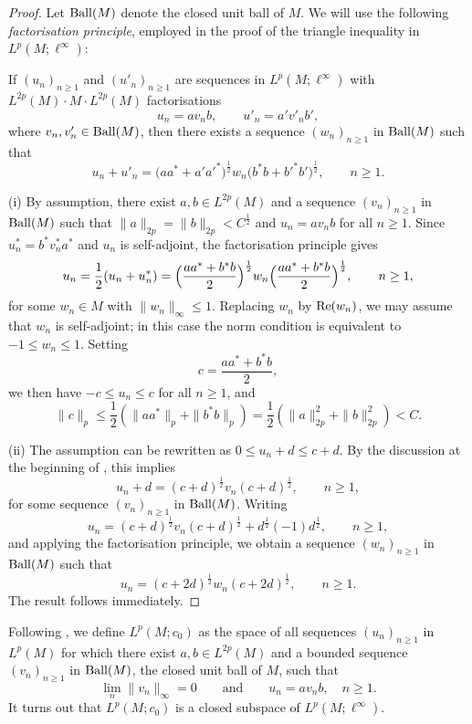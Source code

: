 \documentclass[12pt]{amsart}
\theoremstyle{remark}
\theoremstyle{definition}
\numberwithin{equation}{section}
\begin{document}
\begin{proof}
Let ${\rm Ball}(M)$ denote the closed unit ball of $M$. 
We will use the following {\it factorisation principle}, employed in the proof of the triangle inequality in $L^p(M;\ell^\infty)$: 

If $(u_n)_{n\ge 1}$ and $(u'_n)_{n\ge 1}$ are sequences in $L^p(M;\ell^\infty)$ with $L^{2p}(M) \cdotp M \cdotp L^{2p}(M)$ factorisations
$$
u_n = a v_n b, \qquad u'_n = a' v'_n b',
$$
where $v_n, v'_n \in {\rm Ball}(M)$, then there exists a sequence $(w_n)_{n\ge 1}$ in ${\rm Ball}(M)$ such that
$$
u_n + u'_n = \bigl(aa^* + a'a'^*\bigr)^{\frac12} w_n \bigl(b^*b + b'^*b'\bigr)^{\frac12}, \qquad n \ge 1.
$$

\smallskip
(i) By assumption, there exist $a, b \in L^{2p}(M)$ and a sequence $(v_n)_{n\ge 1}$ in ${\rm Ball}(M)$ such that 
$\|a\|_{2p} = \|b\|_{2p} < C^{\frac12}$ and $u_n = a v_n b$ for all $n \ge 1$.  
Since $u_n^* = b^* v_n^* a^*$ and $u_n$ is self-adjoint, the factorisation principle gives
$$
u_n = \frac12(u_n + u_n^*) = \Bigl(\frac{aa^* + b^*b}{2}\Bigr)^{\frac12} w_n \Bigl(\frac{aa^* + b^*b}{2}\Bigr)^{\frac12}, \qquad n \ge 1,
$$
for some $w_n \in M$ with $\|w_n\|_\infty \le 1$.  
Replacing $w_n$ by ${\rm Re}(w_n)$, we may assume that $w_n$ is self-adjoint; 
in this case the norm condition is equivalent to $-1 \le w_n \le 1$.  
Setting
$$
c = \frac{aa^* + b^*b}{2},
$$
we then have $-c \le u_n \le c$ for all $n \ge 1$, and
$$
\|c\|_p \le \frac12 (\|aa^*\|_p + \|b^*b\|_p) = \frac12 (\|a\|_{2p}^2 + \|b\|_{2p}^2) < C.
$$

\smallskip
(ii) The assumption can be rewritten as $0 \le u_n + d \le c + d$.  
By the discussion at the beginning of \cite[Section 2]{JX}, this implies
$$
u_n + d = (c + d)^{\frac12} v_n (c + d)^{\frac12}, \qquad n \ge 1,
$$
for some sequence $(v_n)_{n\ge 1}$ in ${\rm Ball}(M)$.  Writing
$$
u_n = (c+d)^{\frac12} v_n (c+d)^{\frac12} + d^{\frac12}(-1)d^{\frac12}, \qquad n \ge 1,
$$
and applying the factorisation principle, we obtain a sequence 
$(w_n)_{n\ge 1}$ in ${\rm Ball}(M)$ such that
$$
u_n = (c+2d)^{\frac12} w_n (c+2d)^{\frac12}, \qquad n \ge 1.
$$
The result follows immediately.
\end{proof}


Following \cite[Section 6]{JX}, we define $L^p(M;c_0)$ as the space of all sequences $(u_n)_{n \ge 1}$ in $L^p(M)$ for which there exist $a, b \in L^{2p}(M)$ and a bounded sequence $(v_n)_{n \ge 1}$ in ${\rm Ball}(M)$, the closed unit ball of $M$, such that
$$
\lim_n \|v_n\|_\infty = 0 \qquad \text{and} \qquad u_n = a v_n b, \quad n \ge 1.
$$
It turns out that $L^p(M;c_0)$ is a closed subspace of $L^p(M;\ell^\infty)$.
\end{document}
